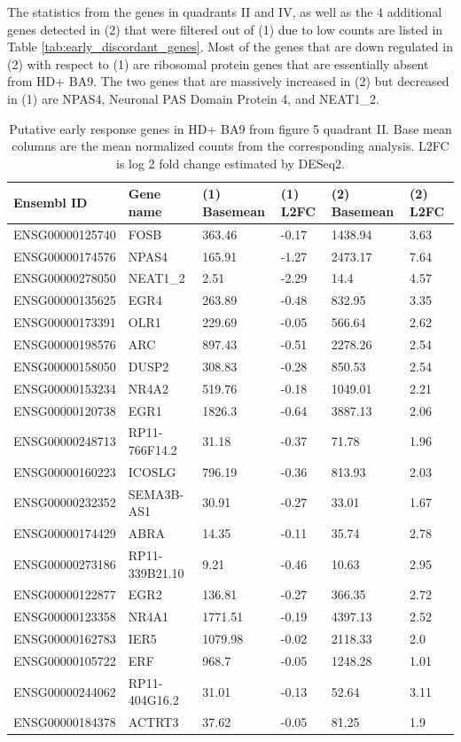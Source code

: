 \documentclass[fleqn,10pt,table]{wlscirep}
\begin{document}
The statistics from the genes in quadrants II and IV, as well as the 4 additional genes detected in (2) that were filtered out of (1) due to low counts are listed in Table \ref{tab:early_discordant_genes}.
Most of the genes that are down regulated in (2) with respect to (1) are ribosomal protein genes that are essentially absent from HD+ BA9.
The two genes that are massively increased in (2) but decreased in (1) are NPAS4, Neuronal PAS Domain Protein 4, and NEAT1\_2.

\begin{table}[ht]
\centering
{}
\begin{tabular}{|l|l|l|l|l|l|} \hline
Ensembl ID & Gene name & (1) Basemean & (1) L2FC & (2) Basemean & (2) L2FC \\ \hline
ENSG00000125740 & FOSB & 363.46 & -0.17 & 1438.94 & 3.63 \\ \hline
ENSG00000174576 & NPAS4 & 165.91 & -1.27 & 2473.17 & 7.64 \\ \hline
ENSG00000278050 & NEAT1\_2 & 2.51 & -2.29 & 14.4 & 4.57 \\ \hline
ENSG00000135625 & EGR4 & 263.89 & -0.48 & 832.95 & 3.35 \\ \hline
ENSG00000173391 & OLR1 & 229.69 & -0.05 & 566.64 & 2.62 \\ \hline
ENSG00000198576 & ARC & 897.43 & -0.51 & 2278.26 & 2.54 \\ \hline
ENSG00000158050 & DUSP2 & 308.83 & -0.28 & 850.53 & 2.54 \\ \hline
ENSG00000153234 & NR4A2 & 519.76 & -0.18 & 1049.01 & 2.21 \\ \hline
ENSG00000120738 & EGR1 & 1826.3 & -0.64 & 3887.13 & 2.06 \\ \hline
ENSG00000248713 & RP11-766F14.2 & 31.18 & -0.37 & 71.78 & 1.96 \\ \hline
ENSG00000160223 & ICOSLG & 796.19 & -0.36 & 813.93 & 2.03 \\ \hline
ENSG00000232352 & SEMA3B-AS1 & 30.91 & -0.27 & 33.01 & 1.67 \\ \hline
ENSG00000174429 & ABRA & 14.35 & -0.11 & 35.74 & 2.78 \\ \hline
ENSG00000273186 & RP11-339B21.10 & 9.21 & -0.46 & 10.63 & 2.95 \\ \hline
ENSG00000122877 & EGR2 & 136.81 & -0.27 & 366.35 & 2.72 \\ \hline
ENSG00000123358 & NR4A1 & 1771.51 & -0.19 & 4397.13 & 2.52 \\ \hline
ENSG00000162783 & IER5 & 1079.98 & -0.02 & 2118.33 & 2.0 \\ \hline
ENSG00000105722 & ERF & 968.7 & -0.05 & 1248.28 & 1.01 \\ \hline
ENSG00000244062 & RP11-404G16.2 & 31.01 & -0.13 & 52.64 & 3.11 \\ \hline
ENSG00000184378 & ACTRT3 & 37.62 & -0.05 & 81.25 & 1.9 \\ \hline
\end{tabular}
\caption{Putative early response genes in HD+ BA9 from figure 5 quadrant II. Base mean columns are the mean normalized counts from the corresponding analysis. L2FC is log 2 fold change estimated by DESeq2. \label{tab:early_discordant_genes_II}}
\end{table}
\end{document}
